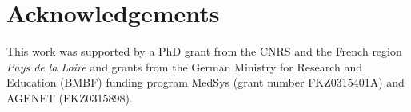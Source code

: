 \section{Acknowledgements}

This work was supported by a PhD grant from the CNRS and the French region \emph{Pays de la Loire} and grants from the German Ministry for Research and Education (BMBF) funding program MedSys (grant number FKZ0315401A) and AGENET (FKZ0315898).
